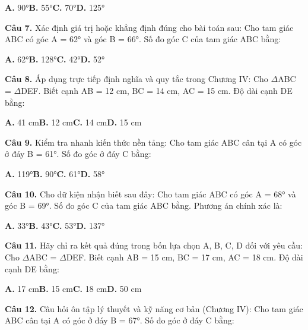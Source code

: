 \documentclass[11pt,a4paper]{article}
\begin{document}
\hspace*{1.5em}\textbf{A.} 90°\quad\quad \textbf{B.} 55°\quad\quad \textbf{C.} 70°\quad\quad \textbf{D.} 125°\par\vspace{2pt}
\textbf{\color{primary} Câu 7.} Xác định giá trị hoặc khẳng định đúng cho bài toán sau: Cho tam giác ABC có góc A = 62° và góc B = 66°. Số đo góc C của tam giác ABC bằng:\par
\hspace*{1.5em}\textbf{A.} 62°\quad\quad \textbf{B.} 128°\quad\quad \textbf{C.} 42°\quad\quad \textbf{D.} 52°\par\vspace{2pt}
\textbf{\color{primary} Câu 8.} Áp dụng trực tiếp định nghĩa và quy tắc trong Chương IV: Cho $\Delta$ABC = $\Delta$DEF. Biết cạnh AB = 12 cm, BC = 14 cm, AC = 15 cm. Độ dài cạnh DE bằng:\par
\hspace*{1.5em}\textbf{A.} 41 cm\quad\quad \textbf{B.} 12 cm\quad\quad \textbf{C.} 14 cm\quad\quad \textbf{D.} 15 cm\par\vspace{2pt}
\textbf{\color{primary} Câu 9.} Kiểm tra nhanh kiến thức nền tảng: Cho tam giác ABC cân tại A có góc ở đáy B = 61°. Số đo góc ở đáy C bằng:\par
\hspace*{1.5em}\textbf{A.} 119°\quad\quad \textbf{B.} 90°\quad\quad \textbf{C.} 61°\quad\quad \textbf{D.} 58°\par\vspace{2pt}
\textbf{\color{primary} Câu 10.} Cho dữ kiện nhận biết sau đây: Cho tam giác ABC có góc A = 68° và góc B = 69°. Số đo góc C của tam giác ABC bằng. Phương án chính xác là:\par
\hspace*{1.5em}\textbf{A.} 33°\quad\quad \textbf{B.} 43°\quad\quad \textbf{C.} 53°\quad\quad \textbf{D.} 137°\par\vspace{2pt}
\textbf{\color{primary} Câu 11.} Hãy chỉ ra kết quả đúng trong bốn lựa chọn A, B, C, D đối với yêu cầu: Cho $\Delta$ABC = $\Delta$DEF. Biết cạnh AB = 15 cm, BC = 17 cm, AC = 18 cm. Độ dài cạnh DE bằng:\par
\hspace*{1.5em}\textbf{A.} 17 cm\quad\quad \textbf{B.} 15 cm\quad\quad \textbf{C.} 18 cm\quad\quad \textbf{D.} 50 cm\par\vspace{2pt}
\textbf{\color{primary} Câu 12.} Câu hỏi ôn tập lý thuyết và kỹ năng cơ bản (Chương IV): Cho tam giác ABC cân tại A có góc ở đáy B = 67°. Số đo góc ở đáy C bằng:\par
\end{document}
